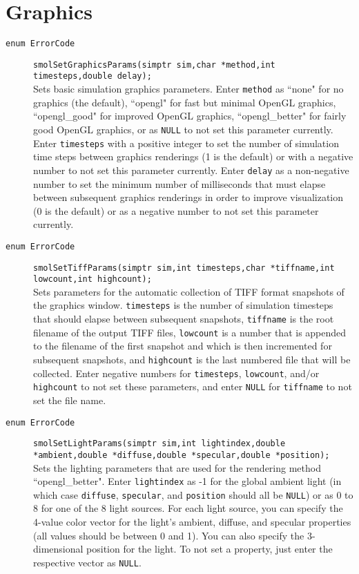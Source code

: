 \documentclass {book}
\begin{document}
\section{Graphics}

\begin{description}

\item[\texttt{enum ErrorCode}]
\texttt{smolSetGraphicsParams(simptr sim,char *method,int timesteps,double delay);}
\hfill \\
Sets basic simulation graphics parameters.  Enter \texttt{method} as ``none" for no graphics (the default), ``opengl" for fast but minimal OpenGL graphics, ``opengl\_good" for improved OpenGL graphics, ``opengl\_better" for fairly good OpenGL graphics, or as \texttt{NULL} to not set this parameter currently.  Enter \texttt{timesteps} with a positive integer to set the number of simulation time steps between graphics renderings (1 is the default) or with a negative number to not set this parameter currently.  Enter \texttt{delay} as a non-negative number to set the minimum number of milliseconds that must elapse between subsequent graphics renderings in order to improve visualization (0 is the default) or as a negative number to not set this parameter currently.

\item[\texttt{enum ErrorCode}]
\texttt{smolSetTiffParams(simptr sim,int timesteps,char *tiffname,int lowcount,int highcount);}
\hfill \\
Sets parameters for the automatic collection of TIFF format snapshots of the graphics window.  \texttt{timesteps} is the number of simulation timesteps that should elapse between subsequent snapshots, \texttt{tiffname} is the root filename of the output TIFF files, \texttt{lowcount} is a number that is appended to the filename of the first snapshot and which is then incremented for subsequent snapshots, and \texttt{highcount} is the last numbered file that will be collected.  Enter negative numbers for \texttt{timesteps}, \texttt{lowcount}, and/or \texttt{highcount} to not set these parameters, and enter \texttt{NULL} for \texttt{tiffname} to not set the file name.

\item[\texttt{enum ErrorCode}]
\texttt{smolSetLightParams(simptr sim,int lightindex,double *ambient,double *diffuse,double *specular,double *position);}
\hfill \\
Sets the lighting parameters that are used for the rendering method ``opengl\_better".  Enter \texttt{lightindex} as -1 for the global ambient light (in which case \texttt{diffuse}, \texttt{specular}, and \texttt{position} should all be \texttt{NULL}) or as 0 to 8 for one of the 8 light sources.  For each light source, you can specify the 4-value color vector for the light's ambient, diffuse, and specular properties (all values should be between 0 and 1).  You can also specify the 3-dimensional position for the light.  To not set a property, just enter the respective vector as \texttt{NULL}.


\end{description}
\end{document}
